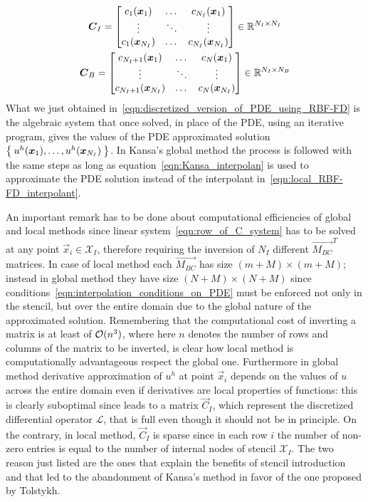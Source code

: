 \begin{equation}
	\begin{gathered}
		\boldsymbol{C}_I = \begin{bmatrix}
						c_1{(\boldsymbol{x}_1)}  	&  \dots  & c_{N_I}(\boldsymbol{x}_1)  	\\
						\vdots				& \ddots  & \vdots					\\
						c_1{(\boldsymbol{x}_{N_I})}  &  \dots  & c_{N_I}(\boldsymbol{x}_{N_I})
					\end{bmatrix} \in \mathbb{R}^{N_I \times N_I}  \\
		\boldsymbol{C}_B = \begin{bmatrix}
						c_{N_I+1}{(\boldsymbol{x}_1)}  	  &  \dots  & c_{N}(\boldsymbol{x}_1)  	\\
						\vdots					  & \ddots  & \vdots				\\
						c_{N_I+1}{(\boldsymbol{x}_{N_I})}  &  \dots  & c_{N}(\boldsymbol{x}_{N_I})
					\end{bmatrix} \in \mathbb{R}^{N_I \times N_B}
	\end{gathered}
\end{equation}
What we just obtained in~\eqref{eqn:discretized_version_of_PDE_using_RBF-FD} is the algebraic system that once solved, in place of the PDE, using an iterative program, gives the values of the PDE approximated solution $\Set{u^h(\boldsymbol{x}_1), \dots, u^h(\boldsymbol{x}_{N_I})}$. In Kansa's global method the process is followed with the same steps as long as equation~\eqref{eqn:Kansa_interpolan} is used to approximate the PDE solution instead of the interpolant in~\eqref{eqn:local_RBF-FD_interpolant}.

\bigskip
An important remark has to be done about computational efficiencies of global and local methods since linear system~\eqref{eqn:row_of_C_system} has to be solved at any point $\vec{x}_i \in \mathcal{X}_I$, therefore requiring the inversion of $N_I$ different $\vec{M_{BC}}^T$ matrices. In case of local method each $\vec{M_{BC}}$ has size $(m+M) \times (m+M)$; instead in global method they have size $(N+M) \times (N+M)$ since conditions~\eqref{eqn:interpolation_conditions_on_PDE} must be enforced not only in the stencil, but over the entire domain due to the global nature of the approximated solution. Remembering that the computational cost of inverting a matrix is at least of $\mathcal{O}(n^3)$, where here $n$ denotes the number of rows and columns of the matrix to be inverted, is clear how local method is computationally advantageous respect the global one.
Furthermore in global method derivative approximation of $u^h$ at point $\vec{x}_i$ depends on the values of $u$ across the entire domain even if derivatives are local properties of functions: this is clearly suboptimal since leads to a matrix $\vec{C}_I$, which represent the discretized differential operator $\mathcal{L}$, that is full even though it should not be in principle. On the contrary, in local method, $\vec{C}_I$ is sparse since in each row $i$ the number of non-zero entries is equal to the number of internal nodes of stencil $\mathcal{X}_I$.
The two reason just listed are the ones that explain the benefits of stencil introduction and that led to the abandonment of Kansa's method in favor of the one proposed by Tolstykh.

